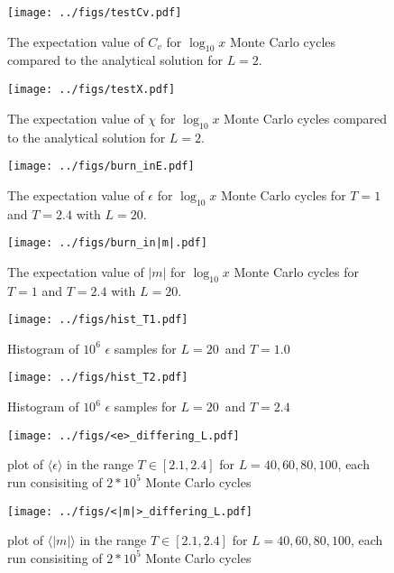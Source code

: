 \documentclass[english,notitlepage,reprint,nofootinbib]{revtex4-1}  %
\begin{document}
\begin{figure}[H]
	\centering
	\texttt{[image: ../figs/testCv.pdf]} %
	\caption{The expectation value of $C_v$ for $\log_{10} x$ Monte Carlo cycles compared to the analytical solution for $L=2$.}
	\label{fig:testCv}
\end{figure}

\begin{figure}[H]
	\centering
	\texttt{[image: ../figs/testX.pdf]} %
	\caption{The expectation value of $\chi$ for $\log_{10} x$ Monte Carlo cycles compared to the analytical solution for $L=2$.}
	\label{fig:testX}
\end{figure}

\begin{figure}[H]
	\centering
	\texttt{[image: ../figs/burn\_inE.pdf]} %
	\caption{The expectation value of $\epsilon$ for $\log_{10} x$ Monte Carlo cycles for $T=1$ and $T=2.4$ with $L=20$.}
	\label{fig:burn_inE}
\end{figure}

\begin{figure}[H]
	\centering
	\texttt{[image: ../figs/burn\_in|m|.pdf]} %
	\caption{The expectation value of $|m|$ for $\log_{10} x$ Monte Carlo cycles for $T=1$ and $T=2.4$ with $L=20$.}
	\label{fig:burn_in|m|}
\end{figure}

\begin{figure}[H]
	\centering
	\texttt{[image: ../figs/hist\_T1.pdf]} %
	\caption{Histogram of $10^6$ $\epsilon$ samples for $L=20$ and $T=1.0$}
	\label{fig:hist_T1}
\end{figure}

\begin{figure}[H]
	\centering
	\texttt{[image: ../figs/hist\_T2.pdf]} %
	\caption{Histogram of $10^6$ $\epsilon$ samples for $L=20$ and $T=2.4$}
	\label{fig:hist_T2}
\end{figure}

\begin{figure}[H]
	\centering
	\texttt{[image: ../figs/<e>\_differing\_L.pdf]} %
	\caption{plot of $\langle\epsilon\rangle$ in the range $T \in [2.1,2.4]$ for $L=40,60,80,100$, each run consisiting of $2*10^5$ Monte Carlo cycles}
	\label{fig:e_differing}
\end{figure}

\begin{figure}[H]
	\centering
	\texttt{[image: ../figs/<|m|>\_differing\_L.pdf]} %
	\caption{plot of $\langle|m|\rangle$ in the range $T \in [2.1,2.4]$ for $L=40,60,80,100$, each run consisiting of $2*10^5$ Monte Carlo cycles}
	\label{fig:m_differing}
\end{figure}
\end{document}
